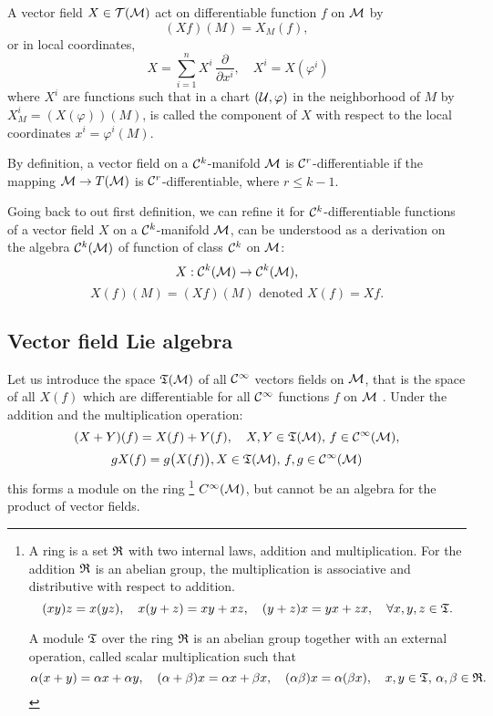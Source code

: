 A vector field $X \in \mathcal{T}(\mathcal{M})$ act on differentiable function $f$ on $\mathcal{M}$ by
\begin{equation}
(Xf)({\scriptstyle M}) =X_{\scriptstyle M} (f), 
 \end{equation}
or in local coordinates,
\begin{equation}~\label{E:tgvecfield}
X=\sum_{i=1}^n X^i\,\frac{\partial}{\partial x^i},  \quad X^{i}=X(\varphi^{i})
\end{equation}
where $X^i$ are functions such that in a chart $(\mathcal{U},\varphi)$ in the neighborhood of $M$ by $ X_{\scriptstyle M}^{i}=(X(\varphi))({\scriptstyle M})$, is called the component of
$X$ with respect to the local coordinates $x^i=\varphi^{i}({\scriptstyle M})$. 

\begin{definition}
By definition, a vector field on a $\mathcal{C}^{k}$-manifold $\mathcal{M}$ is  $\mathcal{C}^{r}$-differentiable if the mapping $\mathcal{M} \to T(\mathcal{M})$ is $\mathcal{C}^{r}$-differentiable, where $r\leq k-1.$
\end{definition}


Going back to out first definition, we can refine it for $\mathcal{C}^{k}$-differentiable functions of a vector field $X$ on a $\mathcal{C}^{k}$-manifold $\mathcal{M}$, can be understood as a derivation on the algebra $\mathcal{C}^{k}(\mathcal{M})$ of function of class $\mathcal{C}^{k}$ on $\mathcal{M}$:
\[X: \mathcal{C}^{k}(\mathcal{M})\to \mathcal{C}^{k}(\mathcal{M}),\]
\[X(f)({\scriptstyle M})=(Xf)({\scriptstyle M}) \text{ denoted } X(f)=Xf. \]


\subsection{Vector field Lie algebra}
Let us introduce the space $\mathfrak{T}(\mathcal{M})$ of all $\mathcal{C}^{\infty}$ vectors fields on $\mathcal{M}$, that is the space of all  $ X(f)$ which are differentiable for all
$\mathcal{C}^{\infty}$ functions $f$ on $\mathcal{M}$ . 
Under the addition and the multiplication operation:
\[(X+Y)(f)=X(f)+Y(f),\quad X,Y \in \mathfrak{T}(\mathcal{M}),\, f \in \mathcal{C}^{\infty}(\mathcal{M}), \] 
\[gX(f)=g\big(X(f)\big),  X \in \mathfrak{T}(\mathcal{M}),\, f,g  \in \mathcal{C}^{\infty}(\mathcal{M}) \]
this forms a module on the ring \footnote{A ring is a set $\mathfrak{R}$ with two internal  laws, addition and multiplication. For the addition $\mathfrak{R}$ is an abelian group, the multiplication is associative and distributive with respect to addition.
\[ (xy)z=x(yz),\quad x(y+z)=xy+xz,\quad (y+z)x=yx+zx,\quad \forall x,y,z\in\mathfrak{T}.\]

A module $\mathfrak{T}$ over the ring $\mathfrak{R}$ is an abelian group together with an external operation, called scalar multiplication such that
\[ \alpha(x+y)=\alpha x+\alpha y, \quad (\alpha+\beta)x=\alpha x+\beta x,\quad  (\alpha\beta)x= \alpha (\beta x ),  \quad x,y\in\mathfrak{T},\,\alpha,\beta \in\mathfrak{R}.
\] } $C^{\infty}(\mathcal{M})$, but cannot be an algebra for the product of vector fields. 

